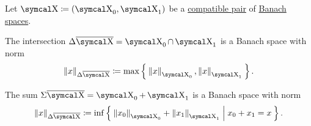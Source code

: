 \begin{proposition}\label{def:banach_space_sum_and_intersection_norms}
  Let \( \CX \coloneqq (\CX_0, \CX_1) \) be a \hyperref[def:interpolated_topological_vector_space/compatibility]{compatible pair} of \hyperref[def:banach_space]{Banach spaces}.

  \begin{PropEnum}
     The intersection \( \Delta \Ol{\CX} = \CX_0 \cap \CX_1 \) is a Banach space with norm
    \begin{equation}\label{eq:def:banach_space_sum_and_intersection_norms/intersection}
      \Norm{x}_{\Delta \Ol{\CX}} \coloneqq \max \Set{ \Norm{x}_{\CX_0}, \Norm{x}_{\CX_1} }.
    \end{equation}

     The sum \( \Sigma \Ol{\CX} = \CX_0 + \CX_1 \) is a Banach space with norm
    \begin{equation}\label{eq:def:banach_space_sum_and_intersection_norms/intersection}
      \Norm{x}_{\Delta \Ol{\CX}} \coloneqq \inf \Set{ \Norm{x_0}_{\CX_0} + \Norm{x_1}_{\CX_1} | x_0 + x_1 = x }.
    \end{equation}
  \end{PropEnum}
\end{proposition}
